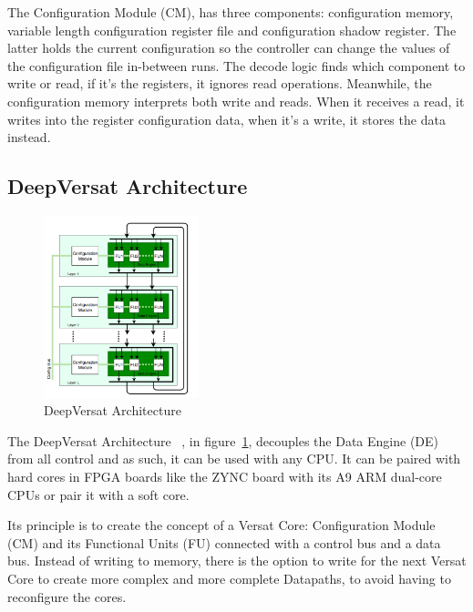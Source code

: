 \documentclass[conference]{IEEEtran}
\begin{document}

The Configuration Module (CM), 
has three components: configuration memory, variable length configuration register file 
and configuration shadow register.
The latter holds the current configuration so the controller can change the values of the configuration file in-between runs.
The decode logic finds which component to write or read, if it's the registers, it ignores read operations.
Meanwhile, the configuration memory interprets both write and reads. When it receives a read,
it writes into the register configuration data, when it's a write, it stores the data instead.


\subsection{DeepVersat Architecture}
\label{subsection:deepversat1}

\begin{figure}[!htb]
    \centering
    \includegraphics[width=0.4\textwidth]{Figures/deep-Versat.png}
    \caption{DeepVersat Architecture~\cite{valter:deepversat}}
    \label{figure:deepversatarch}
\end{figure} 

\quad The DeepVersat Architecture~\cite{valter:deepversat}
, in figure~\ref{figure:deepversatarch}, decouples the Data Engine (DE) from all control and as such, it can be used with any CPU. 
It can be paired with hard cores in
FPGA boards like the ZYNC board %
with its A9 ARM dual-core CPUs or pair it with a soft core.

Its principle is to create the concept of a Versat Core: Configuration Module (CM) and its Functional Units (FU) connected with a control bus and a data bus.
Instead of writing to memory, there is the option to write for the next
Versat Core to create more complex and more complete Datapaths, to avoid
having to reconfigure the cores.
\end{document}
